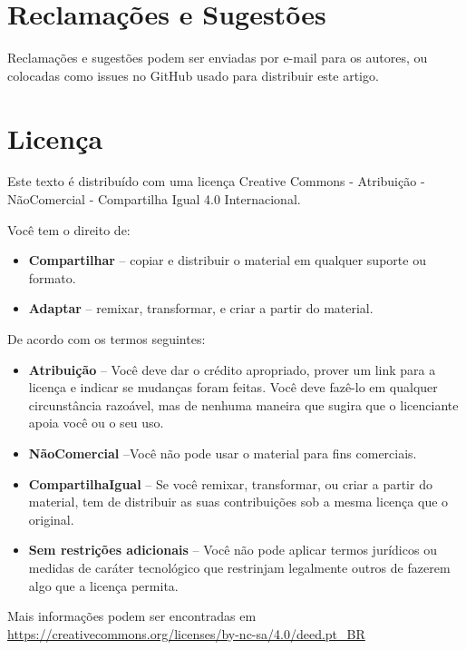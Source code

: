 \section*{Reclamações e Sugestões}

Reclamações e sugestões podem ser enviadas por e-mail para os autores, ou colocadas como issues no GitHub usado para distribuir este artigo.

\section*{Licença}


Este texto é distribuído com uma licença Creative Commons - Atribuição - NãoComercial - Compartilha Igual 4.0 Internacional.




\begin{center}
    \ccbyncsa
\end{center}

Você tem o direito de:
\begin{itemize}
    \item \textbf{Compartilhar} -- copiar e distribuir o material em qualquer suporte ou formato.
    \item \textbf{Adaptar} -- remixar, transformar, e criar a partir do material.
\end{itemize}

De acordo com os termos seguintes:
\begin{itemize}
    \item \textbf{Atribuição} -- Você deve dar o crédito apropriado, prover um link para a licença e indicar se mudanças foram feitas. Você deve fazê-lo em qualquer circunstância razoável, mas de nenhuma maneira que sugira que o licenciante apoia você ou o seu uso.
    \item \textbf{NãoComercial} --Você não pode usar o material para fins comerciais.
    \item \textbf{CompartilhaIgual} -- Se você remixar, transformar, ou criar a partir do material, tem de distribuir as suas contribuições sob a mesma licença que o original.
    \item \textbf{Sem restrições adicionais} -- Você não pode aplicar termos jurídicos ou medidas de caráter tecnológico que restrinjam legalmente outros de fazerem algo que a licença permita.
\end{itemize}

Mais informações podem ser encontradas em \url{https://creativecommons.org/licenses/by-nc-sa/4.0/deed.pt_BR}
